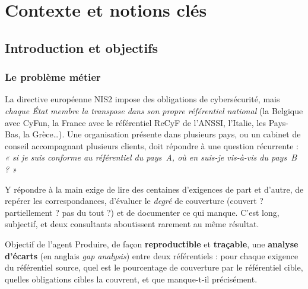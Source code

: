 \documentclass[11pt,a4paper]{report}
\begin{document}
\part{Contexte et notions clés}

\chapter{Introduction et objectifs}

\section{Le problème métier}
La directive européenne NIS2 impose des obligations de cybersécurité, mais \emph{chaque État membre la transpose dans son propre référentiel national} (la Belgique avec CyFun, la France avec le référentiel ReCyF de l'ANSSI, l'Italie, les Pays-Bas, la Grèce\ldots). Une organisation présente dans plusieurs pays, ou un cabinet de conseil accompagnant plusieurs clients, doit répondre à une question récurrente : \emph{« si je suis conforme au référentiel du pays~A, où en suis-je vis-à-vis du pays~B ? »}

Y répondre à la main exige de lire des centaines d'exigences de part et d'autre, de repérer les correspondances, d'évaluer le \emph{degré} de couverture (couvert ? partiellement ? pas du tout ?) et de documenter ce qui manque. C'est long, subjectif, et deux consultants aboutissent rarement au même résultat.

\begin{keybox}{Objectif de l'agent}
Produire, de façon \textbf{reproductible} et \textbf{traçable}, une \textbf{analyse d'écarts} (en anglais \emph{gap analysis}) entre deux référentiels : pour chaque exigence du référentiel source, quel est le pourcentage de couverture par le référentiel cible, quelles obligations cibles la couvrent, et que manque-t-il précisément.
\end{keybox}
\end{document}
